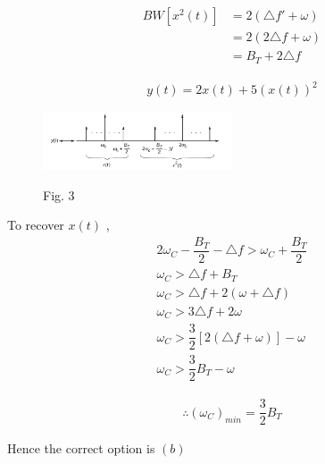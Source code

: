 \documentclass[journal,12pt,twocolumn]{IEEEtran}
\theoremstyle{remark}
\begin{document}
\begin{align}
BW[x^2(t)] &= 2(\triangle f' + \omega) \\
&=2(2\triangle f + \omega) \\
&=B_T + 2\triangle f
\end{align}

\begin{align}
y(t) = 2x(t) + 5(x(t))^2
\end{align}

\begin{figure}[h!]
  \centering
  \includegraphics[width=0.5\textwidth]{figures/cggatefig3.png} 
 \label{cggatefig3}
  \caption*{Fig. 3}
\end{figure}

To recover $x(t)$ ,
\begin{align}
2\omega_C - \dfrac{B_T}{2} - \triangle f > \omega_C + \dfrac{B_T}{2} \\
\omega_C > \triangle f + B_T \\
\omega_C > \triangle f + 2(\omega + \triangle f) \\
\omega_C > 3\triangle f + 2\omega \\
\omega_C > \dfrac{3}{2}[2(\triangle f + \omega)] - \omega \\
 \omega_C > \dfrac{3}{2}B_T - \omega
\end{align}

\begin{align}
\therefore (\omega_C)_{min} = \dfrac{3}{2}B_T
\end{align}

Hence the correct option is $(b)$
\end{document}
